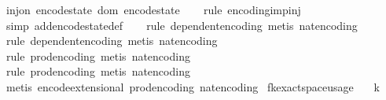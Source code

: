\begin{isabellebody}
\isanewline
{}\isamarkupfalse%
\ {\isachardoublequoteopen}inj{\isacharunderscore}{\kern0pt}on\ encode{\isacharunderscore}{\kern0pt}state\ {\isacharparenleft}{\kern0pt}dom\ encode{\isacharunderscore}{\kern0pt}state{\isacharparenright}{\kern0pt}{\isachardoublequoteclose}\isanewline
%
\isadelimproof
\ \ %
\endisadelimproof
%
\isatagproof
{}\isamarkupfalse%
\ {\isacharparenleft}{\kern0pt}rule\ encoding{\isacharunderscore}{\kern0pt}imp{\isacharunderscore}{\kern0pt}inj{\isacharparenright}{\kern0pt}\isanewline
\ \ \isamarkupfalse%
\ {\isacharparenleft}{\kern0pt}simp\ add{\isacharcolon}{\kern0pt}encode{\isacharunderscore}{\kern0pt}state{\isacharunderscore}{\kern0pt}def{\isacharparenright}{\kern0pt}\isanewline
\ \ \isamarkupfalse%
\ {\isacharparenleft}{\kern0pt}rule\ dependent{\isacharunderscore}{\kern0pt}encoding{\isacharcomma}{\kern0pt}\ metis\ nat{\isacharunderscore}{\kern0pt}encoding{\isacharparenright}{\kern0pt}\isanewline
\ \ \isamarkupfalse%
\ {\isacharparenleft}{\kern0pt}rule\ dependent{\isacharunderscore}{\kern0pt}encoding{\isacharcomma}{\kern0pt}\ metis\ nat{\isacharunderscore}{\kern0pt}encoding{\isacharparenright}{\kern0pt}\isanewline
\ \ \isamarkupfalse%
\ {\isacharparenleft}{\kern0pt}rule\ prod{\isacharunderscore}{\kern0pt}encoding{\isacharcomma}{\kern0pt}\ metis\ nat{\isacharunderscore}{\kern0pt}encoding{\isacharparenright}{\kern0pt}\isanewline
\ \ \isamarkupfalse%
\ {\isacharparenleft}{\kern0pt}rule\ prod{\isacharunderscore}{\kern0pt}encoding{\isacharcomma}{\kern0pt}\ metis\ nat{\isacharunderscore}{\kern0pt}encoding{\isacharparenright}{\kern0pt}\isanewline
\ \ \isamarkupfalse%
\ {\isacharparenleft}{\kern0pt}metis\ encode{\isacharunderscore}{\kern0pt}extensional\ prod{\isacharunderscore}{\kern0pt}encoding\ nat{\isacharunderscore}{\kern0pt}encoding{\isacharparenright}{\kern0pt}%
\endisatagproof
{\isafoldproof}%
%
\isadelimproof
\isanewline
%
\endisadelimproof
\isanewline
{}\isamarkupfalse%
\ fk{\isacharunderscore}{\kern0pt}exact{\isacharunderscore}{\kern0pt}space{\isacharunderscore}{\kern0pt}usage{\isacharcolon}{\kern0pt}\isanewline
\ \ \ {\isachardoublequoteopen}k\ {\isasymge}\ {}{\isachardoublequoteclose}\isanewline
\ \ \ {\isachardoublequoteopen}{\isasymepsilon}\ {\isasymin}\ {\isacharbraceleft}{\kern0pt}{}{\isacharless}{\kern0pt}{\isachardot}{\kern0pt}{\isachardot}{\kern0pt}{\isacharless}{\kern0pt}{}{\isacharbraceright}{\kern0pt}{\isachardoublequoteclose}\isanewline

\end{isabellebody}
